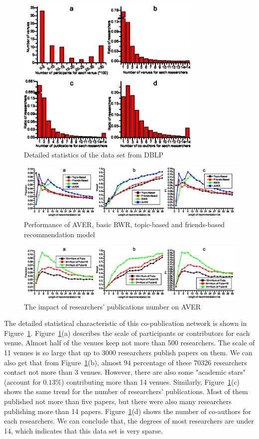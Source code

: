 \documentclass[9pt]{acm_proc_article-sp}
\begin{document}
\begin{figure}[t]
\centering
\includegraphics [width=3.5in]{Fig3.eps}
\caption{Detailed statistics of the data set from DBLP}
\label{fig3}
\end{figure}
\begin{figure}[hbt]
\centering
\includegraphics [width=\textwidth]{Fig4.eps}
\caption{Performance of AVER, basic RWR, topic-based and friends-based recommendation model}
\label{fig4}
\end{figure}
\begin{figure}[hbt]
\centering
\includegraphics [width=\textwidth]{Fig5.eps}
\caption{The impact of researchers' publications number on AVER}
\label{fig5}
\end{figure}

The detailed statistical characteristic of this co-publication network is shown in Figure~\ref{fig3}. Figure~\ref{fig3}(a) describes the scale of participants or contributors for each venue. Almost half of the venues keep not more than 500 researchers. The scale of 11 venues is so large that up to 3000 researchers publish papers on them. We can also get that from Figure~\ref{fig3}(b), almost $94$ percentage of these 70326 researchers contact not more than 3 venues. However, there are also some "academic stars" (account for $0.13\%$) contributing more than 14 venues. Similarly, Figure~\ref{fig3}(c) shows the same trend for the number of researchers' publications. Most of them published not more than five papers, but there were also many researchers publishing more than 14 papers. Figure~\ref{fig3}(d) shows the number of co-authors for each researchers. We can conclude that, the degrees of most researchers are under 14, which indicates that this data set is very sparse.
\end{document}
